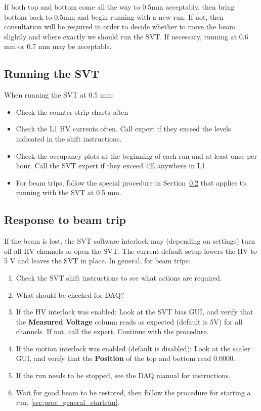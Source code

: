 \documentclass[12pt]{report}
\begin{document}
If both top and bottom come all the way to 0.5mm acceptably, then bring bottom back to 0.5mm and begin running with a new run. If not, then consultation will be required in order to decide whether to move the beam slightly and where exactly we should run the SVT.  If necessary, running at 0.6 mm or 0.7 mm may be acceptable.

\subsection{Running the SVT}

When running the SVT at 0.5 mm:
\begin{itemize}
\item Check the counter strip charts often
\item Check the L1 HV currents often.  Call expert if they exceed the levels indicated in the shift instructions.
\item Check the occupancy plots at the beginning of each run and at least once per hour.  Call the SVT expert if they exceed 4\% anywhere in L1.
\item For beam trips, follow the special procedure in Section~\ref{sec:proc_general_beamtrip} that applies to running with the SVT at 0.5 mm.
\end{itemize}

\subsection{Response to beam trip}
\label{sec:proc_general_beamtrip}
If the beam is lost, the SVT software interlock may (depending on settings) turn off all HV channels or open the SVT.  The current default setup lowers the HV to 5 V and leaves the SVT in place.  In general, for beam trips:
\begin{enumerate}
\item Check the SVT shift instructions to see what actions are required.
\item {\color{red} What should be checked for DAQ?}
\item If the HV interlock was enabled: Look at the SVT bias GUI, and verify that the \textbf{Measured Voltage} column reads as expected (default is 5V) for all channels. If not, call the expert. Continue with the procedure.
\item If the motion interlock was enabled (default is disabled): Look at the scaler GUI, and verify that the \textbf{Position} of the top and bottom read 0.0000.
\item If the run needs to be stopped, see the DAQ manual for instructions.
\item Wait for good beam to be restored, then follow the procedure for starting a run, \ref{sec:proc_general_startrun}.
\end{enumerate}
\end{document}
